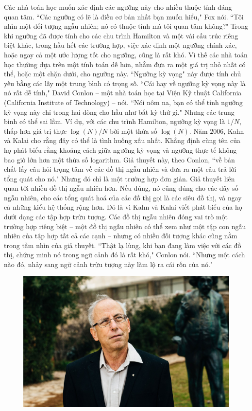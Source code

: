 \begin{multicols}{2}
	\vskip 0.1cm
	Các nhà toán học muốn xác định các ngưỡng này cho nhiều thuộc tính đáng quan tâm. ``Các ngưỡng có lẽ là điều cơ bản nhất bạn muốn hiểu," Fox nói. ``Tôi nhìn một đối tượng ngẫu nhiên; nó có thuộc tính mà tôi quan tâm không?" Trong khi ngưỡng đã được tính cho các chu trình Hamilton và một vài cấu trúc riêng biệt khác, trong  hầu hết các trường hợp, việc xác định một ngưỡng chính xác, hoặc ngay cả một ước lượng tốt cho ngưỡng, cũng là rất khó.
	\vskip 0.1cm
	Vì thế các nhà toán học thường dựa trên một tính toán dễ hơn, nhằm đưa ra một giá trị nhỏ nhất có thể, hoặc một chặn dưới, cho ngưỡng này. ``Ngưỡng kỳ vọng" này được tính chủ yếu bằng các lấy một trung bình có trọng số. ``Cái hay về ngưỡng kỳ vọng này là nó rất dễ tính," David Conlon -- một nhà toán học tại Viện Kỹ thuật California (California Institute of Technology) -- nói. ``Nói nôm na, bạn có thể tính ngưỡng kỳ vọng này chỉ trong hai dòng cho hầu như bất kỳ thứ gì."
	\vskip 0.1cm
	Nhưng các trung bình có thể sai lầm. Ví dụ, với các chu trình Hamilton, ngưỡng kỳ vọng là  $1/N$, thấp hơn giá trị thực $\log(N)/N$ bởi một thừa số $\log(N)$.
	\vskip 0.1cm
	Năm $2006$, Kahn và Kalai cho rằng đây có thể là tình huống xấu nhất. Khẳng định cùng tên của họ phát biểu rằng khoảng cách giữa ngưỡng kỳ vọng và ngưỡng thực tế không bao giờ lớn hơn một thừa số logarithm. Giả thuyết này, theo Conlon, ``về bản chất lấy câu hỏi trọng tâm về các đồ thị ngẫu nhiên và đưa ra một câu trả lời tổng quát cho nó."
	\vskip 0.1cm
	Nhưng đó chỉ là một trường hợp đơn giản. Giả thuyết liên quan tới nhiều đồ thị ngẫu nhiên hơn. Nếu đúng, nó cũng đúng cho các dãy số ngẫu nhiên, cho các tổng quát hoá của các đồ thị gọi là các siêu đồ thị, và ngay cả những kiểu hệ thống rộng hơn. Đó là vì Kahn và Kalai viết phát biểu của họ dưới dạng các tập hợp trừu tượng. Các đồ thị ngẫu nhiên đóng vai trò một trường hợp riêng biệt -- một đồ thị ngẫu nhiên có thể xem như một tập con ngẫu nhiên của tập hợp tất cả các cạnh -- nhưng có nhiều đối tượng khác cũng nằm trong tầm nhìn của giả thuyết. ``Thật lạ lùng, khi bạn đang làm việc với các đồ thị, chứng minh nó trong ngữ cảnh đó là rất khó," Conlon nói. ``Nhưng một cách nào đó, nhảy sang ngữ cảnh trừu tượng này làm lộ ra cái rốn của nó."
		\begin{figure}[H]
		\vspace*{-5pt}
		\centering
		\captionsetup{labelformat= empty, justification=centering}
		\includegraphics[width= 1\linewidth]{3}

\end{figure}
\end{multicols}
